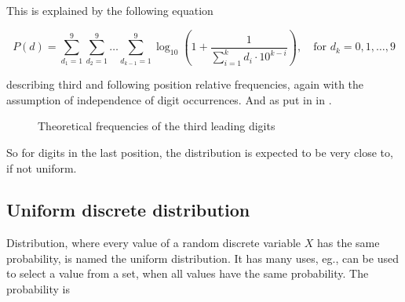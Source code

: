 This is explained by the following equation 

\begin{equation}
    P(d) = \sum\limits_{d_1=1}^{9} \sum\limits_{d_2=1}^{9} \dots \sum\limits_{d_{k-1}=1}^{9}   \log_{10}\left( 1+\frac{1}{\sum\limits_{i=1}^{k} d_i \cdot 10^{k-i} }\right), \quad \text{for } d_k = 0,1,\dots,9 
\end{equation}

describing third and following position relative frequencies, again with the assumption of independence of digit occurrences. And  as put in \citeauthor{Hronova2023} in \citeyear{Hronova2023}. 

\begin{figure}[ht!]
    \centering
    \caption{Theoretical frequencies of the third leading digits}  
    \label{fig:third-digit-law}
    \pgfplotsset{width=8.5cm,compat=1.18}
\end{figure}

So for digits in the last position, the distribution is expected to be very close to, if not uniform. 


\subsection{Uniform discrete distribution}

Distribution, where every value of a random discrete variable $X$ has the same probability, is named the uniform distribution. It has many uses, eg., can be used to select a value from a set, when all values have the same probability. The probability is 

